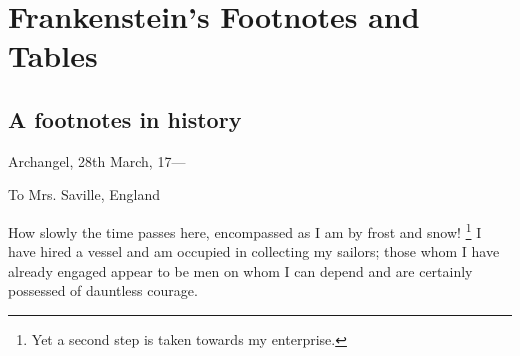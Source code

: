 \chapter{Frankenstein's Footnotes and Tables}

\section{A footnotes in history}
Archangel, 28th March, 17---

To Mrs. Saville, England

How slowly the time passes here, encompassed as I am by frost and snow! 
\footnote{Yet a second step is taken towards my enterprise.} 
I have hired a vessel and am occupied in collecting my sailors; those whom I have already engaged appear to be men on whom I can depend and are certainly possessed of dauntless courage.

